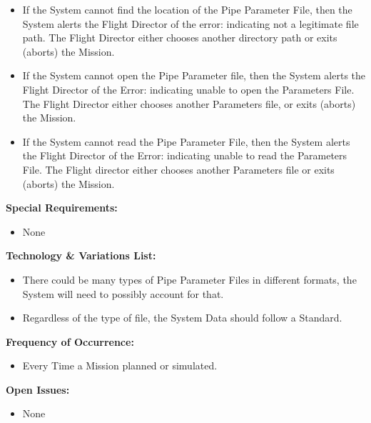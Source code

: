 \documentclass[letterpaper]{article}
\begin{document}
\begin{itemize}
   \item[2a,3a]If the System cannot find the location of the Pipe
      Parameter File, then the System alerts the Flight Director of 
      the error:  indicating not a legitimate file path.  The Flight 
      Director either chooses another directory path or exits 
      (aborts) the Mission.
   \item[4a]If the System cannot open the Pipe Parameter file, then 
      the System alerts the Flight Director of the Error:  indicating
      unable to open the Parameters File.  The Flight Director either
      chooses another Parameters file, or exits (aborts) the Mission.
   \item[5a]If the System cannot read the Pipe Parameter File, then
      the System alerts the Flight Director of the Error:  indicating
      unable to read the Parameters File.  The Flight director either
      chooses another Parameters file or exits (aborts) the Mission.
\end{itemize}
\textbf{Special Requirements:}
\begin{itemize}
   \item None
\end{itemize}
\textbf{Technology \& Variations List:}
\begin{itemize}
   \item There could be many types of Pipe Parameter Files in
      different formats, the System will need to possibly account for
      that.
   \item Regardless of the type of file, the System Data should follow
      a Standard.
\end{itemize}
\textbf{Frequency of Occurrence:}
\begin{itemize}
   \item Every Time a Mission planned or simulated.
\end{itemize}
\textbf{Open Issues:}
\begin{itemize}
   \item None
\end{itemize}
\end{document}
